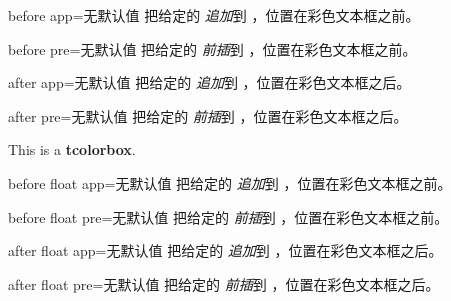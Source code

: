 \begin{docTcbKey}{before app}{=}{无默认值}
  把给定的  \emph{追加}到 ，位置在彩色文本框之前。
\end{docTcbKey}

\begin{docTcbKey}{before pre}{=}{无默认值}
  把给定的  \emph{前插}到 ，位置在彩色文本框之前。
\end{docTcbKey}

\begin{docTcbKey}{after app}{=}{无默认值}
  把给定的  \emph{追加}到 ，位置在彩色文本框之后。
\end{docTcbKey}

\begin{docTcbKey}{after pre}{=}{无默认值}
  把给定的  \emph{前插}到 ，位置在彩色文本框之后。
\end{docTcbKey}

\begin{dispExample}

\begin{tcolorbox}[title=My title,before app={The box follows:\\[4pt]},
  after app={This is the end.}]
This is a \textbf{tcolorbox}.
\end{tcolorbox}
\end{dispExample}

\medskip

\begin{docTcbKey}{before float app}{=}{无默认值}
  把给定的  \emph{追加}到 ，位置在彩色文本框之前。
\end{docTcbKey}

\begin{docTcbKey}{before float pre}{=}{无默认值}
  把给定的  \emph{前插}到 ，位置在彩色文本框之前。
\end{docTcbKey}

\begin{docTcbKey}{after float app}{=}{无默认值}
  把给定的  \emph{追加}到 ，位置在彩色文本框之后。
\end{docTcbKey}

\begin{docTcbKey}{after float pre}{=}{无默认值}
  把给定的  \emph{前插}到 ，位置在彩色文本框之后。
\end{docTcbKey}



